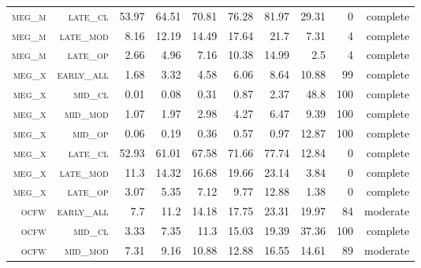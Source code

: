 \begin{landscape}
\begin{table}[!htbp]
\begin{tabular}{@{}rrrrrrr|rrr@{}}
 \textsc{meg\_m}      &  \textsc{late\_cl  }      &  53.97          &  64.51            &  70.81     &  76.28           &  81.97      &  29.31    &  0     &  complete      \\
 \textsc{meg\_m}      &  \textsc{late\_mod }      &  8.16           &  12.19            &  14.49     &  17.64           &  21.7       &  7.31     &  4     &  complete      \\
 \textsc{meg\_m}      &  \textsc{late\_op  }      &  2.66           &  4.96             &  7.16      &  10.38           &  14.99      &  2.5      &  4     &  complete      \\
 \textsc{meg\_x}      &  \textsc{early\_all}      &  1.68           &  3.32             &  4.58      &  6.06            &  8.64       &  10.88    &  99    &  complete       \\
 \textsc{meg\_x}      &  \textsc{mid\_cl   }      &  0.01           &  0.08             &  0.31      &  0.87            &  2.37       &  48.8     &  100   &  complete      \\
 \textsc{meg\_x}      &  \textsc{mid\_mod  }      &  1.07           &  1.97             &  2.98      &  4.27            &  6.47       &  9.39     &  100   &  complete      \\
 \textsc{meg\_x}      &  \textsc{mid\_op   }      &  0.06           &  0.19             &  0.36      &  0.57            &  0.97       &  12.87    &  100   &  complete      \\
 \textsc{meg\_x}      &  \textsc{late\_cl  }      &  52.93          &  61.01            &  67.58     &  71.66           &  77.74      &  12.84    &  0     &  complete      \\
 \textsc{meg\_x}      &  \textsc{late\_mod }      &  11.3           &  14.32            &  16.68     &  19.66           &  23.14      &  3.84     &  0     &  complete      \\
 \textsc{meg\_x}      &  \textsc{late\_op  }      &  3.07           &  5.35             &  7.12      &  9.77            &  12.88      &  1.38     &  0     &  complete      \\
 \textsc{ocfw}        &  \textsc{early\_all}      &  7.7            &  11.2             &  14.18     &  17.75           &  23.31      &  19.97    &  84    &  moderate      \\
 \textsc{ocfw}        &  \textsc{mid\_cl   }      &  3.33           &  7.35             &  11.3      &  15.03           &  19.39      &  37.36    &  100   &  complete      \\
 \textsc{ocfw}        &  \textsc{mid\_mod  }      &  7.31           &  9.16             &  10.88     &  12.88           &  16.55      &  14.61    &  89    &  moderate      \\

\end{tabular}
\end{table}
\end{landscape}
